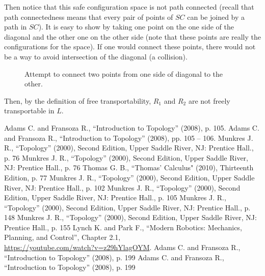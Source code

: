 \documentclass{article}
\theoremstyle{definition}
\begin{document}
Then notice that this safe configuration space is not path connected (recall that path connectedness
means that every pair of points of $SC$ can be joined by a path in $SC$). It is easy to show by taking
one point on the one side of the diagonal and the other one on the other side (note that these points
are really the configurations for the space). If one would connect these points, there would not be a
way to avoid intersection of the diagonal (a collision).

\begin{figure}[H]
    \centering
    \caption*{Attempt to connect two points from one side of diagonal to the other.}
\end{figure}

Then, by the definition of free transportability, $R_1$ and $R_2$ are not freely
transportable in $L$.


\begin{center}
\begin{thebibliography}{00}
     Adams C. and Fransoza R., ``Introduction to Topology'' (2008), p. 105.
     Adams C. and Fransoza R., ``Introduction to Topology'' (2008), pp. 105 -- 106.
     Munkres J. R., ``Topology'' (2000), Second Edition, Upper Saddle River, NJ: Prentice Hall., p. 76
     Munkres J. R., ``Topology'' (2000), Second Edition, Upper Saddle River, NJ: Prentice Hall., p. 76
     Thomas G. B., ``Thomas' Calculus" (2010), Thirteenth Edition, p. 77
     Munkres J. R., ``Topology'' (2000), Second Edition, Upper Saddle River, NJ: Prentice Hall., p. 102
     Munkres J. R., ``Topology'' (2000), Second Edition, Upper Saddle River, NJ: Prentice Hall., p. 105
     Munkres J. R., ``Topology'' (2000), Second Edition, Upper Saddle River, NJ: Prentice Hall., p. 148
     Munkres J. R., ``Topology'' (2000), Second Edition, Upper Saddle River, NJ: Prentice Hall., p. 155
     Lynch K. and Park F., ``Modern Robotics: Mechanics, Planning, and Control'', Chapter 2.1,\\\href{https://youtube.com/watch?v=z29hYlagOYM}{https://youtube.com/watch?v=z29hYlagOYM}.
     Adams C. and Fransoza R., ``Introduction to Topology'' (2008), p. 199
     Adams C. and Fransoza R., ``Introduction to Topology'' (2008), p. 199
\end{thebibliography}
\end{center}
\end{document}
